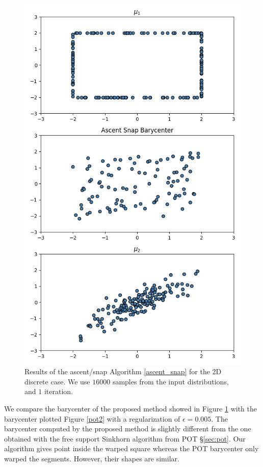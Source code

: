 \begin{figure}
    \centering
    \includegraphics[width=\textwidth]{figures/ascent_snap_2D_discrete_barycenter.png}
    \caption{Results of the ascent/snap Algorithm \ref{ascent_snap} for the 2D discrete case. We use $16000$ samples from the input distributions, and $1$ iteration.}
    \label{fig:ascent_snap_2D_discrete}
\end{figure}

We compare the barycenter of the proposed method showed in Figure \ref{fig:ascent_snap_2D_discrete} with the barycenter plotted Figure \ref{pot2} with a regularization of $\epsilon=0.005$. The barycenter computed by the proposed method is slightly different from the one obtained with the free support Sinkhorn algorithm from POT \S\ref{sec:pot}. Our algorithm gives point inside the warped square whereas the POT barycenter only warped the segments. However, their shapes are similar. 

